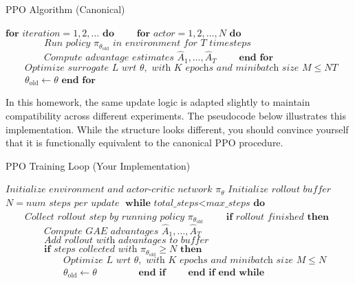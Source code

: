 \documentclass[12pt]{article}
\begin{document}
\begin{algorithm}
\caption{PPO Algorithm (Canonical)\label{alg:ppo_canonical}}
\begin{algorithmic}[1]
\State $\textbf{for } \textit{iteration} = 1, 2, \ldots \textbf{ do}$
\State $\qquad\textbf{for } \textit{actor} = 1, 2, \ldots, N \textbf{ do}$
\State $\qquad\qquad\textit{Run policy } \pi_{\theta_{\text{old}}} \textit{ in environment for } T \textit{ timesteps}$
\State $\qquad\qquad\textit{Compute advantage estimates } \hat{A}_1, \ldots, \hat{A}_T$
\State $\qquad\textbf{end for}$
\State $\qquad\textit{Optimize surrogate } L \textit{ wrt } \theta, \textit{ with } K \textit{ epochs and minibatch size } M \leq NT$
\State $\qquad\theta_{\text{old}} \leftarrow \theta$
\State $\textbf{end for}$
\EndProcedure
\end{algorithmic}
\end{algorithm}

In this homework, the same update logic is adapted slightly to maintain compatibility across different experiments. The pseudocode below illustrates this implementation. While the structure looks different, you should convince yourself that it is functionally equivalent to the canonical PPO procedure.


\begin{algorithm}
\caption{PPO Training Loop (Your Implementation)\label{alg:ppo_impl}}
\begin{algorithmic}[1]
\State $\textit{Initialize environment and actor-critic network } \pi_\theta$
\State $\textit{Initialize rollout buffer}$
\State $N=\textit{num steps per update}$
\State $\textbf{while } \textit{total\_steps} < \textit{max\_steps} \textbf{ do}$
\State $\qquad\textit{Collect rollout step by running policy }\pi_{\theta_{\text{old}}}$
\State $\qquad\textbf{if } \textit{rollout finished} \textbf{ then}$
\State $\qquad\qquad \textit{Compute GAE advantages } \hat{A}_1, \ldots, \hat{A}_T$
\State $\qquad\qquad \textit{Add rollout with advantages to buffer}$
\State $\qquad\qquad\textbf{if } \textit{steps collected with } \pi_{\theta_{\text{old}}}\geq N \textbf{ then}$
\State $\qquad\qquad\qquad\textit{Optimize } L \textit{ wrt } \theta, \textit{ with } K \textit{ epochs and minibatch size } M \leq N$
\State $\qquad\qquad\qquad\theta_{\text{old}} \leftarrow \theta$
\State $\qquad\qquad\textbf{end if}$
\State $\qquad\textbf{end if}$
\State $\textbf{end while}$
\EndProcedure
\end{algorithmic}
\end{algorithm}
\end{document}

